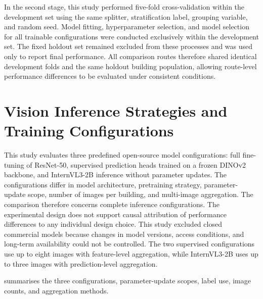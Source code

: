 In the second stage, this study performed five-fold cross-validation within the development set using the same splitter, stratification label, grouping variable, and random seed.
Model fitting, hyperparameter selection, and model selection for all trainable configurations were conducted exclusively within the development set.
The fixed holdout set remained excluded from these processes and was used only to report final performance.
All comparison routes therefore shared identical development folds and the same holdout building population, allowing route-level performance differences to be evaluated under consistent conditions.

\section{Vision Inference Strategies and Training Configurations}
\label{sec:vision_inference_strategies}

This study evaluates three predefined open-source model configurations: full fine-tuning of ResNet-50, supervised prediction heads trained on a frozen DINOv2 backbone, and InternVL3-2B inference without parameter updates.
The configurations differ in model architecture, pretraining strategy, parameter-update scope, number of images per building, and multi-image aggregation.
The comparison therefore concerns complete inference configurations.
The experimental design does not support causal attribution of performance differences to any individual design choice.
This study excluded closed commercial models because changes in model versions, access conditions, and long-term availability could not be controlled.
The two supervised configurations use up to eight images with feature-level aggregation, while InternVL3-2B uses up to three images with prediction-level aggregation.

 summarises the three configurations, parameter-update scopes, label use, image counts, and aggregation methods.

